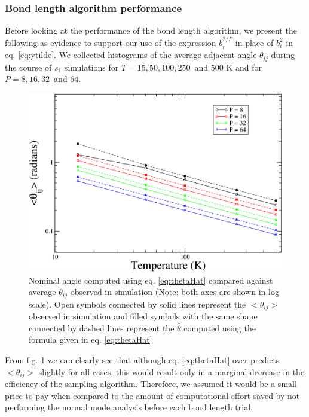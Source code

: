             \subsubsection{Bond length algorithm performance}
                \label{sec:blPerformance}
                Before looking at the performance of the bond length algorithm, we present the following as evidence to support our use of the expression $b_i^{2/P}$ in place of $b_i^2$ in eq. \eqref{eq:ytilde}. We collected histograms of the average adjacent angle $\theta_{ij}$ during the course of $s_1$ simulations for $T = 15, 50, 100, 250$~and $500$ K and for $P = 8, 16, 32$~and $64$.
                \begin{figure}[!htbp]
                    \centering
                    \includegraphics[scale=0.20,keepaspectratio]{Chapter-4/Figures/nominalAnglelogXlogY.png}
                    \caption{Nominal angle computed using eq. \eqref{eq:thetaHat} compared against average $\theta_{ij}$ observed in simulation (Note: both axes are shown in log scale). Open symbols connected by solid lines represent the $<\theta_{ij}>$ observed in simulation and filled symbols with the same shape connected by dashed lines represent the $\hat \theta$ computed using the formula given in eq. \eqref{eq:thetaHat}}
                    \label{fig:nominal_angle}
                \end{figure}

                From fig. \ref{fig:nominal_angle} we can clearly see that although eq. \eqref{eq:thetaHat} over-predicts $<\theta_{ij}>$ slightly for all cases, this would result only in a marginal decrease in the efficiency of the sampling algorithm. Therefore, we assumed it would be a small price to pay when compared to the amount of computational effort saved by not performing the normal mode analysis before each bond length trial.


